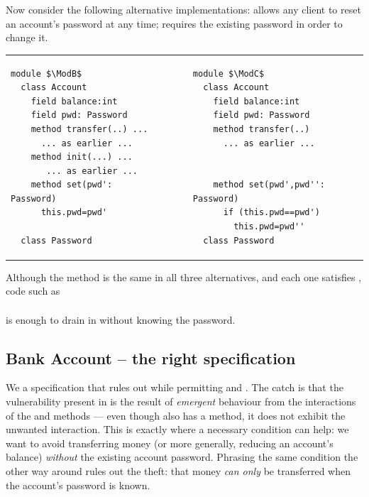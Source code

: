  

Now consider the following alternative implementations:
\ModB allows any client to reset an account's password at any time;
\ModC requires the existing password in order to change it.
  
  

\begin{tabular}{lll}
\begin{minipage}[b]{0.42\textwidth}
\begin{lstlisting}[mathescape=true, language=chainmail, frame=lines]
module $\ModB$
  class Account
    field balance:int 
    field pwd: Password 
    method transfer(..) ...
      ... as earlier ...
    method init(...) ...
       ... as earlier ...
    method set(pwd': Password)
      this.pwd=pwd'
      
  class Password
\end{lstlisting}
\end{minipage}
&\ \ \  \ \   &%
\begin{minipage}[b]{0.45\textwidth}
\begin{lstlisting}[mathescape=true, language=chainmail, frame=lines]
module $\ModC$
  class Account
    field balance:int 
    field pwd: Password 
    method transfer(..) 
      ... as earlier ...
    
    
    method set(pwd',pwd'': Password)
      if (this.pwd==pwd') 
        this.pwd=pwd''
  class Password
\end{lstlisting}
\end{minipage} 
\end{tabular}

Although the  method is the same in
all three alternatives, and each one satisfies \Sclassic,
code  {such as}
\\ 
$\ \strut \hspace{.2in} $ 
\\ 
is enough to drain   in \ModB without knowing the password.


 \subsection{Bank Account -- the right specification}
\label{s:bankSpecEx}

We  a specification that rules out \ModB while permitting \ModA and
\ModC. The catch is that the vulnerability present in \ModB is the result
of  \emph{emergent} behaviour from the interactions of the 
and  methods --- even though \ModC also has a
 method, it does not exhibit the unwanted interaction.
This is exactly where a necessary condition can help:
we want to avoid transferring money
(or more generally, reducing an account's balance)
\textit{without} the existing account password.  Phrasing the same condition
the other way around %
rules out the theft: that money \textit{can only} be
transferred when the account's password is known.


